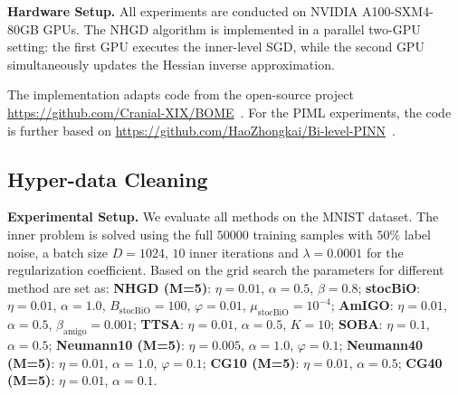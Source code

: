 \documentclass[11 pt]{article}
\begin{document}
\textbf{Hardware Setup.}  
All experiments are conducted on NVIDIA A100-SXM4-80GB GPUs.  
The NHGD algorithm is implemented in a parallel two-GPU setting:  
the first GPU executes the inner-level SGD, while the second GPU 
simultaneously updates the Hessian inverse approximation.  


The implementation adapts code from the open-source project
\url{https://github.com/Cranial-XIX/BOME}~\cite{liu2022bome}.
For the PIML experiments, the code is further based on
\url{https://github.com/HaoZhongkai/Bi-level-PINN}~\cite{hao2023bi}.

\subsection{Hyper-data Cleaning}\label{app:experiments_datacleaning}

\textbf{Experimental Setup.}  
We evaluate all methods on the MNIST dataset. The inner problem is solved using the full $50000$ training samples with $50\%$ label noise, a batch size $D=1024$, $10$ inner iterations and $\lambda=0.0001$ for the  regularization coefficient. Based on the grid search the parameters for different method are set as:  %
\textbf{NHGD (M=5)}: $\eta = 0.01$, $\alpha = 0.5$, $\beta = 0.8$;  
\textbf{stocBiO}: $\eta = 0.01$, $\alpha = 1.0$, $B_\text{stocBiO}=100$, $\varphi=0.01$, $\mu_\text{stocBiO}=10^{-4}$; 
\textbf{AmIGO}: $\eta = 0.01$, $\alpha = 0.5$, $\beta_\text{amigo} = 0.001$; 
\textbf{TTSA}: $\eta = 0.01$, $\alpha = 0.5$, $K=10$;  %
\textbf{SOBA}: $\eta = 0.1$, $\alpha = 0.5$; %
 \textbf{Neumann10 (M=5)}: $\eta = 0.005$, $\alpha = 1.0$, $\varphi = 0.1$;  
\textbf{Neumann40 (M=5)}: $\eta = 0.01$, $\alpha = 1.0$, $\varphi = 0.1$;  
\textbf{CG10 (M=5)}: $\eta = 0.01$, $\alpha = 0.5$;  
\textbf{CG40 (M=5)}: $\eta = 0.01$, $\alpha = 0.1$.
\end{document}
